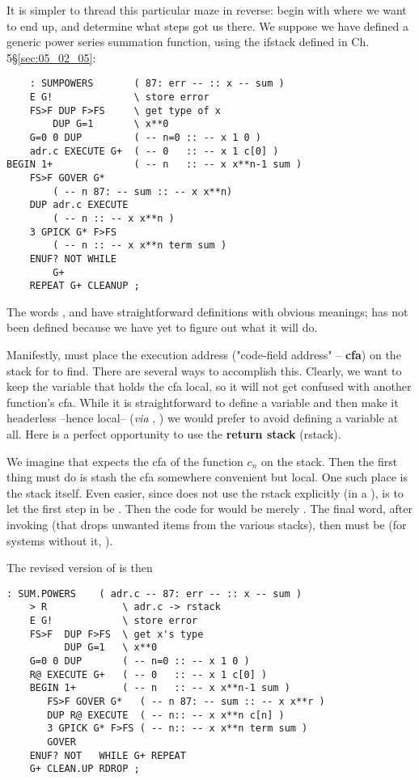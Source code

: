 It is simpler to thread this particular maze in reverse: begin with where we want to end up, and determine what steps got us there. We suppose we have defined a generic power series summation function, using the ifstack defined in Ch. 5\S\ref{sec:05_02_05}:
\begin{lstlisting}
    : SUMPOWERS       ( 87: err -- :: x -- sum )
    E G!              \ store error
    FS>F DUP F>FS     \ get type of x
        DUP G=1       \ x**0
    G=0 0 DUP         ( -- n=0 :: -- x 1 0 )
    adr.c EXECUTE G+  ( -- 0   :: -- x 1 c[0] )
BEGIN 1+              ( -- n   :: -- x x**n-1 sum )
    FS>F GOVER G*
        ( -- n 87: -- sum :: -- x x**n)
    DUP adr.c EXECUTE
        ( -- n :: -- x x**n )
    3 GPICK G* F>FS
        ( -- n :: -- x x**n term sum )
    ENUF? NOT WHILE
        G+
    REPEAT G+ CLEANUP ;
\end{lstlisting}

The words ,  and  have straightforward definitions with obvious meanings;  has not been defined because we have yet to figure out what it will do.

Manifestly,  must place the execution address ("code-field address" -- \textbf{cfa}) on the stack for  to find. There are several ways to accomplish this. Clearly, we want to keep the variable that holds the cfa local, so it will not get confused with another function's cfa. While it is straightforward to define a variable and then make it headerless --hence local-- (\textit{via} , \eg) we would prefer to avoid defining a variable at all. Here is a perfect opportunity to use the \textbf{return stack} (rstack).

We imagine that  expects the cfa of the function $c_n$ on the stack. Then the first thing  must do is stash the cfa somewhere convenient but local. One such place is the stack itself. Even easier, since  does not use the rstack explicitly (\eg in a ), is to let the first step in  be . Then the code for  would be merely . The final word, after invoking  (that drops unwanted items from the various stacks), then must be  (for systems without it,  ).

The revised version of  is then
\begin{lstlisting}
: SUM.POWERS    ( adr.c -- 87: err -- :: x -- sum )
    > R             \ adr.c -> rstack
    E G!            \ store error
    FS>F  DUP F>FS  \ get x's type
          DUP G=1   \ x**0
    G=0 0 DUP       ( -- n=0 :: -- x 1 0 )
    R@ EXECUTE G+   ( -- 0   :: -- x 1 c[0] )
    BEGIN 1+        ( -- n   :: -- x x**n-1 sum )
       FS>F GOVER G*   ( -- n 87: -- sum :: -- x x**r )
       DUP R@ EXECUTE  ( -- n:: -- x x**n c[n] )
       3 GPICK G* F>FS ( -- n:: -- x x**n term sum )
       GOVER
    ENUF? NOT   WHILE G+ REPEAT
    G+ CLEAN.UP RDROP ;
\end{lstlisting}


